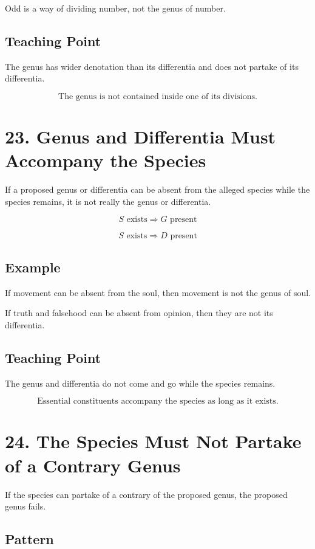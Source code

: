 \documentclass[12pt]{article}
\begin{document}
Odd is a way of dividing number, not the genus of number.

\subsection*{Teaching Point}

The genus has wider denotation than its differentia and does not partake of its
differentia.

\[
\boxed{
\text{The genus is not contained inside one of its divisions.}
}
\]

\section*{23. Genus and Differentia Must Accompany the Species}

If a proposed genus or differentia can be absent from the alleged species while
the species remains, it is not really the genus or differentia.

\[
S \text{ exists} \Rightarrow G \text{ present}
\]

\[
S \text{ exists} \Rightarrow D \text{ present}
\]

\subsection*{Example}

If movement can be absent from the soul, then movement is not the genus of soul.

If truth and falsehood can be absent from opinion, then they are not its
differentia.

\subsection*{Teaching Point}

The genus and differentia do not come and go while the species remains.

\[
\boxed{
\text{Essential constituents accompany the species as long as it exists.}
}
\]

\section*{24. The Species Must Not Partake of a Contrary Genus}

If the species can partake of a contrary of the proposed genus, the proposed
genus fails.

\subsection*{Pattern}
\end{document}
